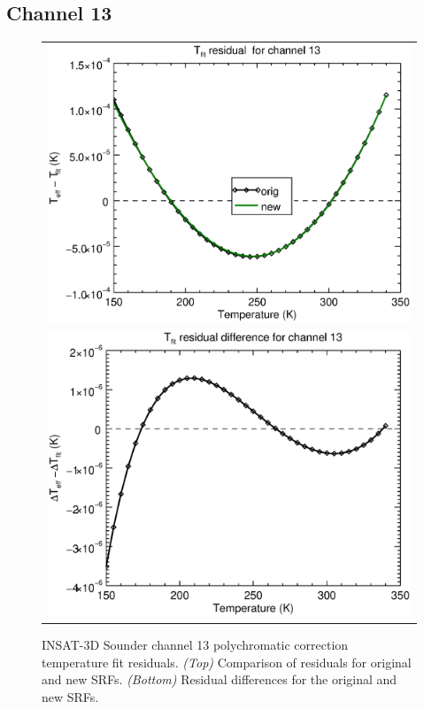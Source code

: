 \subsection{Channel 13}
\begin{figure}[H]
  \centering
  \begin{tabular}{c}
    \includegraphics[scale=0.55]{graphics/sndr/tfit/sndr_insat3d-13.tfit.eps} \\
    \includegraphics[scale=0.55]{graphics/sndr/tfit/sndr_insat3d-13.tfit.difference.eps}
  \end{tabular}
  \caption{INSAT-3D Sounder channel 13 polychromatic correction temperature fit residuals. \emph{(Top)} Comparison of residuals for original and new SRFs. \emph{(Bottom)} Residual differences for the original and new SRFs.}
  \label{fig:sndr_ch13_tfit}
\end{figure}

